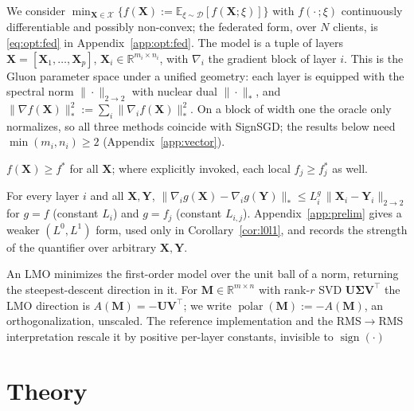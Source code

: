 We consider $\min_{\mathbf{X} \in \mathcal{X}} \{f(\mathbf{X}) := \mathbb{E}_{\xi \sim \mathcal{D}} [f(\mathbf{X};\xi)]\}$ with $f(\cdot\,;\xi)$ continuously differentiable and possibly non-convex; the federated form, over $N$ clients, is \eqref{eq:opt:fed} in Appendix~\ref{app:opt:fed}. The model is a tuple of layers $\mathbf{X} = [\mathbf{X}_1,\dots,\mathbf{X}_p]$, $\mathbf{X}_i \in \mathbb{R}^{m_i\times n_i}$, with $\nabla_i$ the gradient block of layer $i$. This is the Gluon parameter space \citep{riabinin2025gluon} under a unified geometry: each layer is equipped with the spectral norm $\|\cdot\|_{2\to2}$ with nuclear dual $\|\cdot\|_{*}$, and $\|\nabla f(\mathbf{X})\|_*^2 := \sum_i\|\nabla_i f(\mathbf{X})\|_*^2$. On a block of width one the oracle only normalizes, so all three methods coincide with SignSGD; the results below need $\min(m_i,n_i)\ge2$ (Appendix~\ref{app:vector}).

\begin{assumption}\label{as:1}
$f(\mathbf{X}) \ge f^*$ for all $\mathbf{X}$; where explicitly invoked, each local $f_j \ge f_j^*$ as well.
\end{assumption}

\begin{assumption}\label{as:2}
For every layer $i$ and all $\mathbf{X},\mathbf{Y}$, $\|\nabla_i g(\mathbf{X}) - \nabla_i g(\mathbf{Y})\|_{*} \le L_i^{g}\,\|\mathbf{X}_i - \mathbf{Y}_i\|_{2\to 2}$ for $g = f$ (constant $L_i$) and $g = f_j$ (constant $L_{i,j}$). Appendix~\ref{app:prelim} gives a weaker $(L^0,L^1)$ form, used only in Corollary~\ref{cor:l0l1}, and records the strength of the quantifier over arbitrary $\mathbf{X},\mathbf{Y}$.
\end{assumption}

An LMO minimizes the first-order model over the unit ball of a norm, returning the steepest-descent direction in it. For $\mathbf{M}\in\mathbb{R}^{m\times n}$ with rank-$r$ SVD $\mathbf{U}\boldsymbol{\Sigma}\mathbf{V}^\top$ the LMO direction is $A(\mathbf{M})=-\mathbf{U}\mathbf{V}^\top$; we write $\operatorname{polar}(\mathbf{M}):=-A(\mathbf{M})$, an orthogonalization, unscaled. The reference implementation and the RMS$\to$RMS interpretation rescale it by positive per-layer constants, invisible to $\operatorname{sign}(\cdot)$

\section{Theory}\label{sec:theory}

